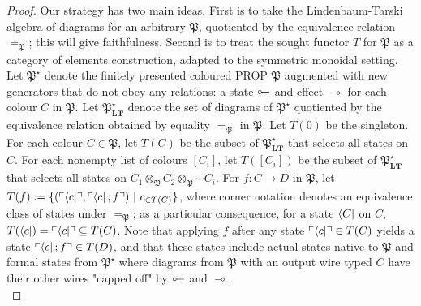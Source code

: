 \begin{theorem}
\begin{proof}
Our strategy has two main ideas. First is to take the Lindenbaum-Tarski algebra of diagrams for an arbitrary $\mathfrak{P}$, quotiented by the equivalence relation $=_\mathfrak{P}$; this will give faithfulness. Second is to treat the sought functor $T$ for $\mathfrak{P}$ as a category of elements construction, adapted to the symmetric monoidal setting. Let $\mathfrak{P}^\star$ denote the finitely presented coloured PROP $\mathfrak{P}$ augmented with new generators that do not obey any relations: a state $\rotatebox[origin=c]{180}{$\multimap$}$ and effect $\multimap$ for each colour $C$ in $\mathfrak{P}$. Let $\mathfrak{P}^\star_{\mathbf{LT}}$ denote the set of diagrams of $\mathfrak{P}^\star$ quotiented by the equivalence relation obtained by equality $=_\mathfrak{P}$ in $\mathfrak{P}$. Let $T(0)$ be the singleton. For each colour $C \in \mathfrak{P}$, let $T(C)$ be the subset of $\mathfrak{P}^\star_{\mathbf{LT}}$ that selects all states on $C$. For each nonempty list of colours $[C_i]$, let $T([C_i])$ be the subset of $\mathfrak{P}^\star_{\mathbf{LT}}$ that selects all states on $C_1 \otimes_\mathfrak{P} C_2 \otimes_\mathfrak{P} \cdots C_i$. For $f: C \rightarrow D$ in $\mathfrak{P}$, let $T(f) := \{(\ulcorner \bra{c} \urcorner, \ulcorner \bra{c};f \urcorner) \ | \ c_{\in T(C)}\}$, where corner notation denotes an equivalence class of states under $=_\mathfrak{P}$; as a particular consequence, for a state $\bra{C}$ on $C$, $T(\bra{c}) = \ulcorner \bra{c} \urcorner \subseteq T(C)$. Note that applying $f$ after any state $\ulcorner \bra{c} \urcorner \in T(C)$ yields a state $\ulcorner \bra{c} ; f \urcorner \in T(D)$, and that these states include actual states native to $\mathfrak{P}$ and formal states from $\mathfrak{P}^\star$ where diagrams from $\mathfrak{P}$ with an output wire typed $C$ have their other wires "capped off" by $\rotatebox[origin=c]{180}{$\multimap$}$ and $\multimap$.\\


\end{proof}
\end{theorem}

